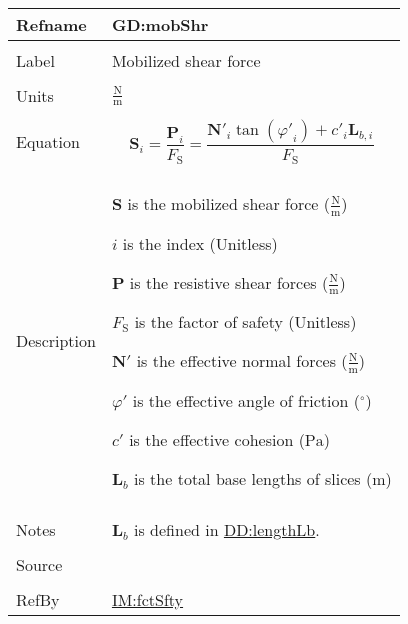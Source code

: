 \documentclass[12pt]{article}
\begin{document}
\vspace{\baselineskip}
\noindent
\begin{minipage}{\textwidth}
\begin{tabular}{>{\raggedright}p{}>{\raggedright\arraybackslash}p{}}
\toprule \textbf{Refname} & \textbf{GD:mobShr}
\label{GD:mobShr}
\\ \midrule \\
Label & Mobilized shear force
        
\\ \midrule \\
Units & $\frac{\text{N}}{\text{m}}$
        
\\ \midrule \\
Equation & \begin{displaymath}
           {\symbf{S}}_{i}=\frac{{\symbf{P}}_{i}}{{F_{\text{S}}}}=\frac{{\symbf{N'}}_{i} \tan\left({φ'}_{i}\right)+{c'}_{i} {\symbf{L}_{b,i}}}{{F_{\text{S}}}}
           \end{displaymath}
\\ \midrule \\
Description & \begin{symbDescription}
              \item{$\symbf{S}$ is the mobilized shear force ($\frac{\text{N}}{\text{m}}$)}
              \item{$i$ is the index (Unitless)}
              \item{$\symbf{P}$ is the resistive shear forces ($\frac{\text{N}}{\text{m}}$)}
              \item{${F_{\text{S}}}$ is the factor of safety (Unitless)}
              \item{$\symbf{N'}$ is the effective normal forces ($\frac{\text{N}}{\text{m}}$)}
              \item{$φ'$ is the effective angle of friction (${{}^{\circ}}$)}
              \item{$c'$ is the effective cohesion (${\text{Pa}}$)}
              \item{${\symbf{L}_{b}}$ is the total base lengths of slices (${\text{m}}$)}
              \end{symbDescription}
\\ \midrule \\
Notes & ${\symbf{L}_{b}}$ is defined in \hyperref[DD:lengthLb]{DD:lengthLb}.
        
\\ \midrule \\
Source & \cite{chen2005}
         
\\ \midrule \\
RefBy & \hyperref[IM:fctSfty]{IM:fctSfty}
        
\\ \bottomrule
\end{tabular}
\end{minipage}
\end{document}
